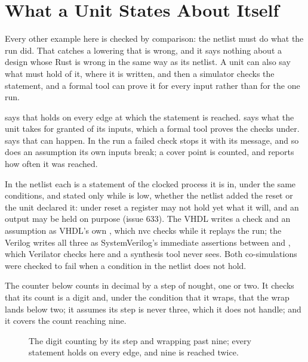 \section{What a Unit States About Itself}
\label{sec:x-formal}

Every other example here is checked by comparison: the netlist must
do what the run did. That catches a lowering that is wrong, and it says
nothing about a design whose Rust is wrong in the same way as its
netlist. A unit can also say what must hold of it, where it is
written, and then a simulator checks the statement, and a formal tool
can prove it for every input rather than for the one run.

 says that  holds on every edge
at which the statement is reached.  says
what the unit takes for granted of its inputs, which a formal tool
proves the checks under.  says that
 can happen. In the run a failed check stops it with its
message, and so does an assumption its own inputs break; a cover
point is counted, and  reports how often it was reached.

In the netlist each is a statement of the clocked process it is in,
under the same conditions, and stated only while  is low,
whether the netlist added the reset or the unit declared it: under
reset a register may not hold yet what it will, and an output may be
held on purpose (issue 633). The VHDL writes a check
and an assumption as VHDL's own , which nvc checks while
it replays the run; the Verilog writes all three as SystemVerilog's
immediate assertions between  and ,
which Verilator checks here and a synthesis tool never sees. Both
co-simulations were checked to fail when a condition in the netlist
does not hold.

The counter below counts in decimal by a step of nought, one or two.
It checks that its count is a digit and, under the condition that it
wraps, that the wrap lands below two; it assumes its step is never
three, which it does not handle; and it covers the count reaching
nine.

\begin{figure}[htbp]
\centering

\caption{The digit counting by its step and wrapping past nine; every
statement holds on every edge, and nine is reached twice.}
\label{fig:x-formal}
\end{figure}




